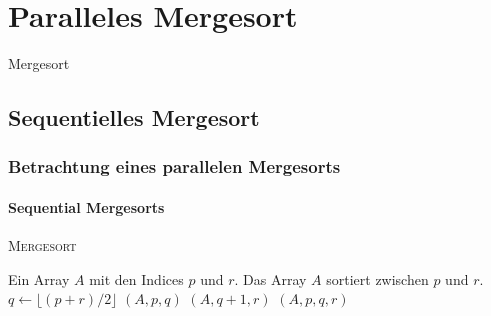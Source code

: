 \section{Paralleles Mergesort}

\begin{frame}
    \centering
    \Huge{Mergesort}
\end{frame}

\subsection{Sequentielles Mergesort}
\begin{frame}
    \frametitle{Betrachtung eines parallelen Mergesorts}
    \framesubtitle{Sequential Mergesorts}
    \begin{algorithm}[H]
        \caption{{\rmfamily \textsc{Mergesort}} \cite[S.34]{cormen}}
        \label{alg:mergesort}
        \begin{algorithmic}[1]
            \Require Ein Array $A$ mit den Indices $p$ und $r$.
            \Ensure Das Array $A$ sortiert zwischen $p$ und $r$.
                \State $q \gets \lfloor (p + r) / 2 \rfloor$
                $(A, p, q)$
                $(A, q + 1, r)$
                $(A, p, q, r)$
            \EndIf
        \end{algorithmic}
    \end{algorithm}
\end{frame}

